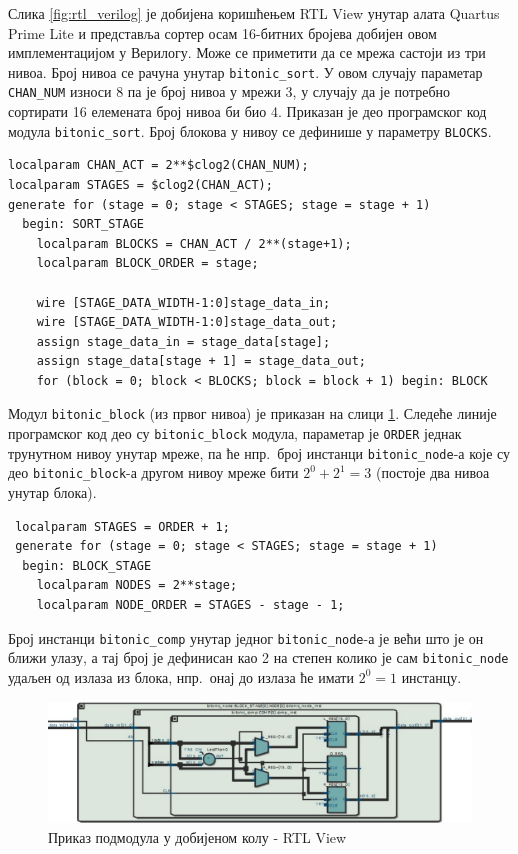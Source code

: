 \documentclass[12pt, a4paper]{article}
\theoremstyle{definition}
\begin{document}
Слика \ref{fig:rtl_verilog} је добијена коришћењем RTL View унутар алата Quartus Prime Lite и представља сортер осам 16-битних бројева добијен овом имплементацијом у Верилогу. Може се приметити да се мрежа састоји из три нивоа. Број нивоа се рачуна унутар \verb+bitonic_sort+. У овом случају параметар \verb+CHAN_NUM+ износи 8 па је број нивоа у мрежи 3, у случају да је потребно сортирати 16 елемената број нивоа би био 4. Приказан је део програмског код модула \verb+bitonic_sort+. Број блокова у нивоу се дефинише у параметру \verb+BLOCKS+.

\begin{verbatim}
localparam CHAN_ACT = 2**$clog2(CHAN_NUM);
localparam STAGES = $clog2(CHAN_ACT);
generate for (stage = 0; stage < STAGES; stage = stage + 1)
  begin: SORT_STAGE
	localparam BLOCKS = CHAN_ACT / 2**(stage+1);
	localparam BLOCK_ORDER = stage;

	wire [STAGE_DATA_WIDTH-1:0]stage_data_in;
	wire [STAGE_DATA_WIDTH-1:0]stage_data_out;
	assign stage_data_in = stage_data[stage];
	assign stage_data[stage + 1] = stage_data_out;
	for (block = 0; block < BLOCKS; block = block + 1) begin: BLOCK
\end{verbatim}

Модул \verb+bitonic_block+ (из првог нивоа) је приказан на слици \ref{fig:rtl_verilogSub}. Следеће линије програмског код део су \verb+bitonic_block+ модула, параметар је \verb+ORDER+ једнак трунутном нивоу унутар мреже, па ће нпр.\ број инстанци \verb+bitonic_node+-а које су део \verb+bitonic_block+-а другом нивоу мреже бити $2^0 + 2^1 = 3$ (постоје два нивоа унутар блока).

\begin{verbatim}
 localparam STAGES = ORDER + 1;
 generate for (stage = 0; stage < STAGES; stage = stage + 1)
  begin: BLOCK_STAGE
	localparam NODES = 2**stage;
	localparam NODE_ORDER = STAGES - stage - 1;
\end{verbatim}

Број инстанци \verb+bitonic_comp+ унутар једног \verb+bitonic_node+-а је већи што је он ближи улазу, а тај број је дефинисан као 2 на степен колико је сам \verb+bitonic_node+ удаљен од излаза из блока, нпр.\ онај до излаза ће имати $2^0=1$ инстанцу.
\begin{figure}[H]
  \centering
      \includegraphics[scale=0.35]{slike/rtl_verilogSub2.png}
  \caption{Приказ подмодула у добијеном колу - RTL View}
  \label{fig:rtl_verilogSub}
\end{figure}
\end{document}
